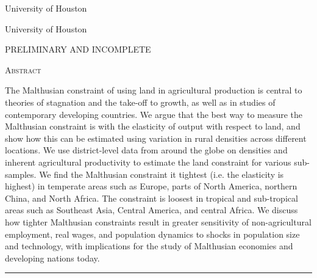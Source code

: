 \documentclass[11pt]{article}
\begin{document}
\begin{titlepage}
\vspace{2in} \noindent {\large \today}

\vspace{.5in} 

\vspace{.25in} 

\vspace{.05in} \noindent University of Houston

\vspace{.25in} 

\vspace{.05in} \noindent University of Houston

\vspace{.25in} \noindent PRELIMINARY AND INCOMPLETE

\vfill \noindent \textsc{Abstract} \hrulefill

\vspace{.05in} \noindent The Malthusian constraint of using land in agricultural production is central to theories of stagnation and the take-off to growth, as well as in studies of contemporary developing countries. We argue that the best way to measure the Malthusian constraint is with the elasticity of output with respect to land, and show how this can be estimated using variation in rural densities across different locations. We use district-level data from around the globe on densities and inherent agricultural productivity to estimate the land constraint for various sub-samples. We find the Malthusian constraint it tightest (i.e. the elasticity is highest) in temperate areas such as Europe, parts of North America, northern China, and North Africa. The constraint is loosest in tropical and sub-tropical areas such as Southeast Asia, Central America, and central Africa. We discuss how tighter Malthusian constraints result in greater sensitivity of non-agricultural employment, real wages, and population dynamics to shocks in population size and technology, with implications for the study of Malthusian economies and developing nations today.

\vspace{.1in} \hrule

\vspace{.5in} 

\vspace{.1in} 

\vspace{.1in} 
\end{titlepage}
\end{document}
